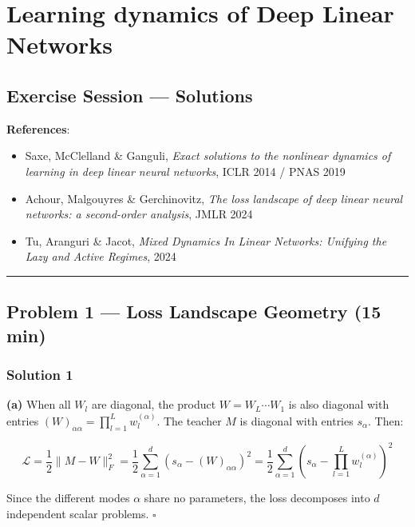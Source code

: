 \documentclass[
]{article}
\author{}
\date{}
\providecommand{\tightlist}{%
  \setlength{\itemsep}{0pt}\setlength{\parskip}{0pt}}
\begin{document}
\section{Learning dynamics of Deep Linear
Networks}\label{implicit-regularization-in-deep-linear-networks}

\subsection{Exercise Session ---
Solutions}\label{exercise-session-solutions}

\textbf{References}:

\begin{itemize}
\tightlist
\item
  Saxe, McClelland \& Ganguli, \emph{Exact solutions to the nonlinear
  dynamics of learning in deep linear neural networks}, ICLR 2014 / PNAS
  2019
\item
  Achour, Malgouyres \& Gerchinovitz, \emph{The loss landscape of deep
  linear neural networks: a second-order analysis}, JMLR 2024
\item
  Tu, Aranguri \& Jacot, \emph{Mixed Dynamics In Linear Networks:
  Unifying the Lazy and Active Regimes}, 2024
\end{itemize}

\begin{center}\rule{0.5\linewidth}{0.5pt}\end{center}

\subsection{Problem 1 --- Loss Landscape Geometry (15
min)}\label{problem-1-loss-landscape-geometry-15-min}

\subsubsection{Solution 1}\label{solution-1}

\textbf{(a)} When all \(W_l\) are diagonal, the product
\(W = W_L \cdots W_1\) is also diagonal with entries
\((W)_{\alpha\alpha} = \prod_{l=1}^L w_l^{(\alpha)}\). The teacher \(M\)
is diagonal with entries \(s_\alpha\). Then:

\[\mathcal{L} = \frac{1}{2}\|M - W\|_F^2 = \frac{1}{2}\sum_{\alpha=1}^d (s_\alpha - (W)_{\alpha\alpha})^2 = \frac{1}{2}\sum_{\alpha=1}^d \left(s_\alpha - \prod_{l=1}^L w_l^{(\alpha)}\right)^2\]

Since the different modes \(\alpha\) share no parameters, the loss
decomposes into \(d\) independent scalar problems. \(\square\)
\end{document}
